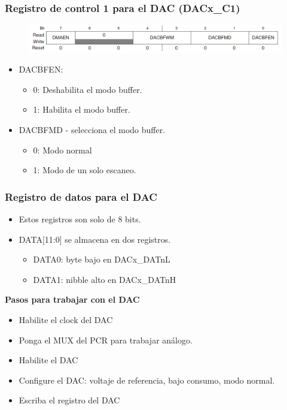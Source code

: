 \documentclass[10.5pt,scale=1.0,t,aspectratio=169,hyperref={pdfpagelabels=false}]{beamer}
\begin{document}
\begin{frame}
	\frametitle{Registro de control 1 para el DAC (DACx\_C1)}
	{\small
		\begin{figure}
			\centering
			\includegraphics[scale=0.7]{fig_DACxC1}
		\end{figure}
		\begin{itemize}
			\item DACBFEN:
			\begin{itemize}
				\item 0: Deshabilita el modo buffer.
				\item 1: Habilita el modo buffer.
			\end{itemize}
			\item DACBFMD - selecciona el modo buffer.
			\begin{itemize}
				\item 0: Modo normal
				\item 1: Modo de un solo escaneo. 
			\end{itemize}
		\end{itemize}	
	}
\end{frame}
\begin{frame}
	\frametitle{Registro de datos para el DAC}
	{\small
		\begin{itemize}
			\item Estos registros son solo de 8 bits.
			\item DATA[11:0] se almacena en dos registros.
			\begin{itemize}
				\item DATA0: byte bajo en DACx\_DATnL
				\item DATA1: nibble alto en DACx\_DATnH
			\end{itemize}
		\end{itemize}
	
	\textbf{Pasos para trabajar con el DAC}
	
	 \begin{itemize}
	 	\setlength\itemsep{0em}
	 	\item Habilite el clock del DAC
	 	\item Ponga el MUX del PCR para trabajar análogo.
	 	\item Habilite el DAC
	 	\item Configure el DAC: voltaje de referencia, bajo consumo, modo normal.
	 	\item Escriba el registro del DAC
	 \end{itemize}
	}
\end{frame}
\end{document}
